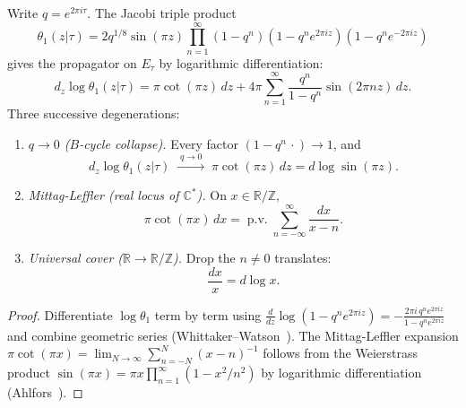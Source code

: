 \begin{proposition}
\label{prop:fourier-propagator-degeneration}
Write $q = e^{2\pi i\tau}$.
The Jacobi triple product
\[
\theta_1(z|\tau)
= 2q^{1/8}\sin(\pi z)
 \prod_{n=1}^{\infty}
 (1-q^n)(1-q^n e^{2\pi iz})(1-q^n e^{-2\pi iz})
\]
gives the propagator on $E_\tau$ by logarithmic differentiation:
\begin{equation}\label{eq:fourier-theta-product}
d_z\log\theta_1(z|\tau)
= \pi\cot(\pi z)\,dz
 + 4\pi\sum_{n=1}^{\infty}
 \frac{q^n}{1-q^n}\sin(2\pi n z)\,dz.
\end{equation}
Three successive degenerations:
\begin{enumerate}
\item \emph{$q \to 0$ \textup{(}$B$-cycle collapse\textup{)}.}
 Every factor $(1 - q^n\,\cdot) \to 1$, and
 \begin{equation}\label{eq:fourier-propagator-degen}
 d_z\log\theta_1(z|\tau)
 \;\xrightarrow{\;q \to 0\;}\;
 \pi\cot(\pi z)\,dz
 = d\log\sin(\pi z).
 \end{equation}
\item \emph{Mittag-Leffler \textup{(}real locus of $\mathbb{C}^*$\textup{)}.}
 On $x \in \mathbb{R}/\mathbb{Z}$,
 \begin{equation}\label{eq:fourier-propagator-real}
 \pi\cot(\pi x)\,dx
 = \operatorname{p.v.}\!\sum_{n=-\infty}^{\infty}
 \frac{dx}{x - n}.
 \end{equation}
\item \emph{Universal cover \textup{(}$\mathbb{R} \to \mathbb{R}/\mathbb{Z}$\textup{)}.}
 Drop the $n \neq 0$ translates:
 \begin{equation}\label{eq:fourier-propagator-R}
 \frac{dx}{x} = d\log x.
 \end{equation}
\end{enumerate}
\end{proposition}

\begin{proof}
Differentiate $\log\theta_1$
term by term using $\frac{d}{dz}\log(1-q^ne^{2\pi iz})
= -\frac{2\pi i\,q^n e^{2\pi iz}}{1-q^n e^{2\pi iz}}$
and combine geometric series
(Whittaker--Watson~\cite[\S21.3]{WW27}).
The Mittag-Leffler expansion
$\pi\cot(\pi x)
= \lim_{N\to\infty}\sum_{n=-N}^{N}(x-n)^{-1}$
follows from the Weierstrass product
$\sin(\pi x) = \pi x\prod_{n=1}^{\infty}(1-x^2/n^2)$
by logarithmic differentiation
(Ahlfors~\cite[\S5.2]{Ahlfors79}).
\end{proof}

